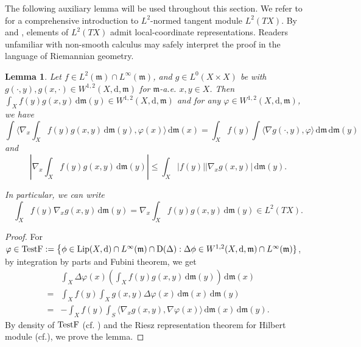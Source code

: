 \documentclass[a4paper,11pt]{article}
\numberwithin{equation}{section}
\theoremstyle{plain}
\newtheorem{lemma}[theorem]{Lemma}
\theoremstyle{definition}
\theoremstyle{remark}
\newcommand{\mm}{\mathfrak m}
\newcommand{\ms}{(X,\d,\mm)}
\newcommand{\Lip}{\mathop{\rm Lip}\nolimits}
\renewcommand{\d}{{\mathrm d}}
\newcommand{\D}{{\mathrm D}}
\begin{document}
	
The following auxiliary lemma will be used throughout this section. 	 We refer to \cite{G-N,  zbMATH07183685} for a comprehensive introduction to $L^2$-normed  tangent module $L^2(TX)$.   By \cite[Proposition 2.9]{H-R} and \cite[Theorem 1.4.11]{G-N}, elements of $L^2(TX)$ admit local-coordinate representations.  Readers unfamiliar with non-smooth calculus may safely interpret the proof in the language of Riemannian geometry.


		\begin{lemma}\label{grad}
		Let $f\in L^2(\mm)\cap L^\infty(\mm)$,  and $g\in L^0(X\times X)$ be with $g(\cdot, y),  g(x, \cdot) \in W^{1,2}\ms$ for  $\mm$-a.e. $x, y\in X$. Then  
	$
		\int_X f(y)  g(x,y)\,\d\mm(y)\in W^{1,2}\ms$  and for any $\varphi \in W^{1,2}\ms$, we have  
\begin{equation}\label{l2.4}
\int \langle \nabla_x \int_X f(y)  g(x,y)\,\d\mm(y),\varphi(x) \rangle\,\d\mm(x)=\int_X f(y)\int \langle  \nabla g(\cdot,   y), \varphi\rangle\,\d\mm\,\d\mm(y)
\end{equation}
and
	\begin{equation}\label{17}
		\left|\nabla_x \int_X f(y)  g(x,y)\,\d\mm(y)\right|\leq \int_X |f(y)| |\nabla_x g(x,y)|\,\d\mm(y).
		\end{equation}
		
In particular,   we can write
		\begin{equation}
			\int_X f(y) \nabla_x g(x,y)\,\d\mm(y)=\nabla_x \int_X f(y)  g(x,y)\,\d\mm(y)\in L^2(TX).
		\end{equation}
	\end{lemma}
	\begin{proof}
	 For $\varphi\in	{\rm TestF}:=\big\{\phi\in \Lip(X, \d)\cap L^\infty(\mm)\cap \D(\Delta): \Delta \phi \in W^{1,2}(X,\d,\mm)\cap L^\infty(\mm)\}$,  by integration by parts and Fubini theorem, we get
		\begin{equation}
			\begin{aligned}
			&\int_X \Delta \varphi(x) \left(\int_X f(y)g(x,y)\,\d\mm(y)\right)\,\d\mm(x)\\
			=&\int_X f(y)\int_X g(x,y)\Delta \varphi(x)\,\d\mm(x)\,\d\mm(y)\\
			=&-\int_X f(y)\int_S \langle  \nabla_x g(x,y),\nabla \varphi(x)\rangle\,\d\mm(x)\,\d\mm(y).
			\end{aligned}
		\end{equation}
By density of ${\rm TestF}$ (cf.  \cite[\S 3.2]{G-N}) and the Riesz representation theorem for Hilbert module (cf.\cite[Theorem 3.2.14,  Example 3.2.15 ]{zbMATH07183685}), we prove the lemma.
			\end{proof}
		
\end{document}
